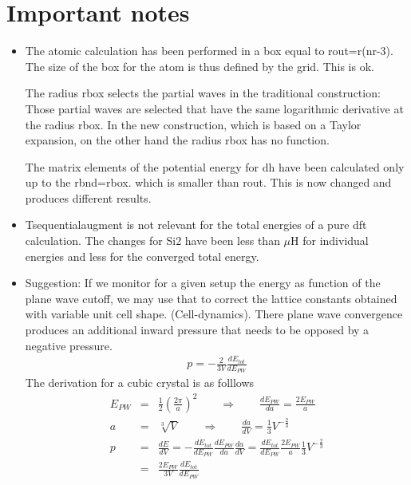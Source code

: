 \documentclass[11pt,a4paper]{report}
\begin{document}
\section{Important notes}
\begin{itemize}
\item The atomic calculation has been performed in a box equal to
  rout=r(nr-3). The size of the box for the atom is thus defined by the
  grid. This is ok.

  The radius rbox selects the partial waves in the traditional
  construction: Those partial waves are selected that have the same
  logarithmic derivative at the radius rbox. In the new construction,
  which is based on a Taylor expansion, on the other hand the radius
  rbox has no function.

  The matrix elements of the potential energy for dh have been
  calculated only up to the rbnd=rbox. which is smaller than rout.
  This is now changed and produces different results.
%
\item Tsequentialaugment is not relevant for the total energies of a
  pure dft calculation. The changes for Si2 have been less than $\mu$H
  for individual energies and less for the converged total energy.
%
\item Suggestion: If we monitor for a given setup the energy as
  function of the plane wave cutoff, we may use that to correct the
  lattice constants obtained with variable unit cell
  shape. (Cell-dynamics). There plane wave convergence produces an
  additional inward pressure that needs to be opposed by a negative
  pressure.
\begin{eqnarray}
 p=-\frac{2}{3V}\frac{dE_{tot}}{dE_{PW}}
\end{eqnarray}
 The derivation for a cubic crystal is as folllows
\begin{eqnarray}
E_{PW}&=&\frac{1}{2}\left(\frac{2\pi}{a}\right)^2
\qquad\Rightarrow\qquad
\frac{dE_{PW}}{da}=\frac{2E_{PW}}{a}
\nonumber\\
a&=&\sqrt[3]{V}\qquad\Rightarrow\qquad
\frac{da}{dV}=\frac{1}{3}V^{-\frac{2}{3}}
\nonumber\\
p&=&\frac{dE}{dV}=-\frac{dE_{tot}}{dE_{PW}}\frac{dE_{PW}}{da}\frac{da}{dV}
=\frac{dE_{tot}}{dE_{PW}}\frac{2E_{PW}}{a}\frac{1}{3}V^{-\frac{2}{3}}
\nonumber\\
&=&\frac{2E_{PW}}{3V}\frac{dE_{tot}}{dE_{PW}}
\end{eqnarray}
\end{itemize}
\end{document}

